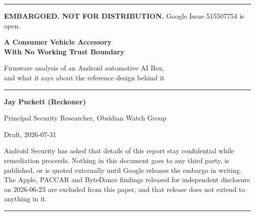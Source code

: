 \begin{titlepage}
\thispagestyle{empty}
\raggedright
\vspace*{2.2cm}

{\color{crit}\rule{\linewidth}{2.5pt}}
\vspace{4pt}

{\footnotesize\color{crit}\textbf{EMBARGOED. NOT FOR DISTRIBUTION.}\quad
 Google Issue 515507754 is open.}

\vspace{3.4cm}

{\fontsize{27}{32}\selectfont\bfseries\color{ink}
A Consumer Vehicle Accessory\\With No Working Trust Boundary\par}

\vspace{14pt}
{\large\color{ink2}
Firmware analysis of an Android automotive AI Box,\\
and what it says about the reference design behind it\par}

\vspace{2.6cm}
{\color{hairline}\rule{\linewidth}{0.6pt}}
\vspace{12pt}

{\normalsize\color{ink}\textbf{Jay Puckett (Reckoner)}\par}
{\small\color{ink2}Principal Security Researcher, Obsidian Watch Group\par}

\vspace{10pt}
{\small\color{ink2}Draft, 2026-07-31\par}

\vfill

{\footnotesize\color{ink2}
Android Security has asked that details of this report stay confidential while
remediation proceeds. Nothing in this document goes to any third party, is
published, or is quoted externally until Google releases the embargo in writing.
The Apple, PACCAR and ByteDance findings released for independent disclosure on
2026-06-23 are excluded from this paper, and that release does not extend to
anything in it.\par}

\vspace{10pt}
{\color{crit}\rule{\linewidth}{2.5pt}}
\end{titlepage}
